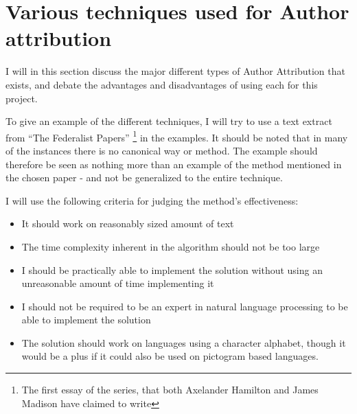 \section{Various techniques used for Author attribution}
\label{choiceMethod}
I will in this section discuss the major different types of Author Attribution that exists, and debate the advantages and disadvantages of using each for this project.

To give an example of the different techniques, I will try to use a text extract from ``The Federalist Papers'' \cite{federalist} \footnote{The first essay of the series, that both Axelander Hamilton and James Madison have claimed to write} in the examples. It should be noted that in many of the instances there is no canonical way or method. The example should therefore be seen as nothing more than an example of the method mentioned in the chosen paper - and not be generalized to the entire technique.

I will use the following criteria for judging the method's effectiveness:
\begin{itemize}
\item It should work on reasonably sized amount of text
\item The time complexity inherent in the algorithm should not be too large
\item I should be practically able to implement the solution without using an unreasonable amount of time implementing it
\item I should not be required to be an expert in natural language processing to be able to implement the solution
\item The solution should work on languages using a character alphabet, though it would be a plus if it could also be used on pictogram based languages.
\end{itemize}

